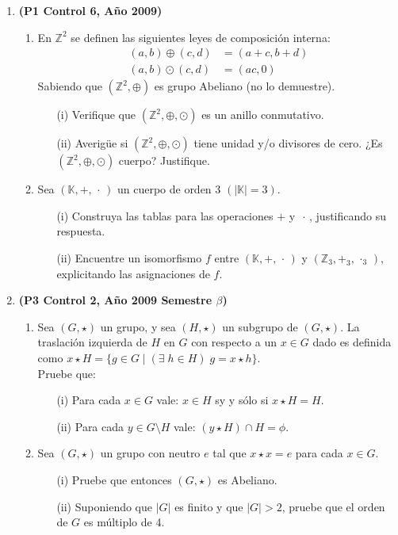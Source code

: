 \documentclass[11pt]{article}
\newcommand{\Z}{\mathbb Z}
\newcommand{\K}{\mathbb K}
\theoremstyle{plain}
\theoremstyle{definition}
\begin{document}
\begin{enumerate}
\item \textbf{(P1 Control 6, Año 2009)}
\begin{enumerate}
\item En $\Z^2$ se definen las siguientes leyes de composición interna: %
\begin{align*}
(a,b)\oplus (c,d)&=(a+c,b+d)\\
(a,b)\odot (c,d)&=(ac,0)
\end{align*}
Sabiendo que $(\Z^2,\oplus)$ es grupo Abeliano (no lo demuestre).
\begin{enumerate}
\item[(i)] Verifique que $(\Z^2,\oplus,\odot)$ es un anillo conmutativo.
\item[(ii)] Averigüe si $(\Z^2,\oplus,\odot)$ tiene unidad y/o divisores de cero. ¿Es $(\Z^2,\oplus,\odot)$ cuerpo? Justifique.
\end{enumerate}
\item Sea $(\K,+,\,\cdot\,)$ un cuerpo de orden 3 $(|\K|=3)$.
\begin{enumerate}
\item[(i)] Construya las tablas para las operaciones $+$ y $\,\cdot\,$, justificando su respuesta.
\item[(ii)] Encuentre un isomorfismo $f$ entre $(\K,+,\,\cdot\,)$ y $(\Z_3,+_3,\,\cdot_3\,)$, explicitando las asignaciones de $f$.
\end{enumerate}
\end{enumerate}

\item \textbf{(P3 Control 2, Año 2009 Semestre $\beta$)}
\begin{enumerate}
\item Sea $(G,\star)$ un grupo, y sea $(H,\star)$ un subgrupo de $(G,\star)$. La traslación izquierda de $H$ en $G$ con respecto a un $x\in G$ dado es definida como $x\star H=\{g\in G\;|\;(\exists\;h\in H)\; g=x\star h\}.$\\ 
Pruebe que:
\begin{enumerate}
\item[(i)] Para cada $x\in G$ vale: $x\in H$ sy y sólo si $x\star H=H$.
\item[(ii)] Para cada $y \in G\setminus H$ vale: $(y\star H)\cap H=\phi$.
\end{enumerate}
\item Sea $(G,\star)$ un grupo con neutro $e$ tal que $x\star x=e$ para cada $x\in G$.
\begin{enumerate}
\item[(i)] Pruebe que entonces $(G,\star)$ es Abeliano.
\item[(ii)] Suponiendo que $|G|$ es finito y que $|G|>2$, pruebe que el orden de $G$ es múltiplo de 4.
\end{enumerate}
\end{enumerate}




\end{enumerate}
\end{document}

